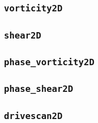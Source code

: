 \documentclass[
12pt,
a4paper,
twoside]
{article}
\begin{document}
\subsection{\texttt{vorticity2D}}

\subsection{\texttt{shear2D}}

\subsection{\texttt{phase\_{}vorticity2D}}

\subsection{\texttt{phase\_{}shear2D}}

\subsection{\texttt{drivescan2D}}

\end{document}

